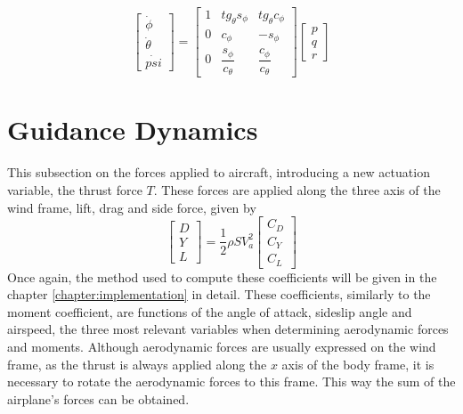 \begin{equation}
\begin{bmatrix}
\dot{\phi}\\
\dot{\theta}\\
\dot{psi}
\end{bmatrix}
=
\begin{bmatrix}
1 & tg_\theta s_\phi & tg_\theta c_\phi\\
0 & c_\phi & -s_\phi\\
0 & \dfrac{s_\phi}{c_\theta} & \dfrac{c_\phi}{c_\theta}
\end{bmatrix}
\begin{bmatrix}
p\\
q\\
r
\end{bmatrix}
\label{eq:euler2omega}
\end{equation}

\section{Guidance Dynamics}
\label{section:background/model/guidance_dynamics}

This subsection on the forces applied to aircraft, introducing a new actuation variable, the thrust force $T$. These forces are applied along the three axis of the wind frame, lift, drag and side force, given by
\begin{equation}
\begin{bmatrix}
D\\
Y\\
L
\end{bmatrix}
= \dfrac{1}{2} \rho SV_a^2
\begin{bmatrix}
C_D\\
C_Y\\
C_L
\end{bmatrix}
\label{eq:forces}
\end{equation}
Once again, the method used to compute these coefficients will be given in the chapter \ref{chapter:implementation} in detail. These coefficients, similarly to the moment coefficient, are functions of the angle of attack, sideslip angle and airspeed, the three most relevant variables when determining aerodynamic forces and moments. Although aerodynamic forces are usually expressed on the wind frame, as the thrust is always applied along the $x$ axis of the body frame, it is necessary to rotate the aerodynamic forces to this frame. This way the sum of the airplane's forces can be obtained. 

